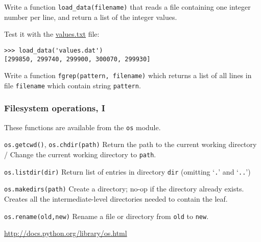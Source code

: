 \documentclass[english,serif,mathserif,xcolor=pdftex,dvipsnames,table]{beamer}
\begin{document}
\begin{frame}[fragile]
  \begin{exercise*}[5.D]
    Write a function \lstinline|load_data(filename)| that reads a file
    containing one integer number per line, and return a list of the
    integer values.

    \+
    Test it with the
    \href{https://raw.github.com/gc3-uzh-ch/python-course/master/values.txt}{values.txt}
    file:
\begin{lstlisting}
>>> load_data('values.dat')
[299850, 299740, 299900, 300070, 299930]
\end{lstlisting}
  \end{exercise*}

  \begin{exercise*}[5.E]
    Write a function \lstinline|fgrep(pattern, filename)| which returns a list of
    all lines in file \texttt{filename} which contain string \texttt{pattern}.
  \end{exercise*}
\end{frame}


\begin{frame}[fragile]
  \frametitle{Filesystem operations, I}
  \small
  These functions are available from the \texttt{os} module.

  \begin{describe}{\lstinline|os.getcwd()|, \lstinline|os.chdir(path)|}
    Return the path to the current working directory /
    Change the current working directory to \texttt{path}.
  \end{describe}

  \begin{describe}{\lstinline|os.listdir(dir)|}
    Return list of entries in directory \texttt{dir} (omitting
    `\texttt{.}' and `\texttt{..}')
  \end{describe}


  \begin{describe}{\lstinline|os.makedirs(path)|}
    Create a directory; no-op if the directory already exists.
    Creates all the intermediate-level directories needed to contain
    the leaf.
  \end{describe}

  \begin{describe}{\lstinline|os.rename(old,new)|}
    Rename a file or directory from \texttt{old} to \texttt{new}.
  \end{describe}

  \begin{references}
    \url{http://docs.python.org/library/os.html}
  \end{references}
\end{frame}
\end{document}
